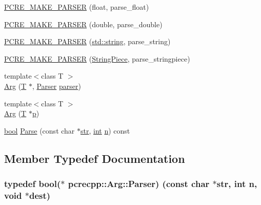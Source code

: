 \begin{DoxyCompactItemize}
\item 
\hyperlink{classpcrecpp_1_1Arg_a0fa5f65840145efa1d6d79f80f412862}{P\+C\+R\+E\+\_\+\+M\+A\+K\+E\+\_\+\+P\+A\+R\+S\+ER} (float, parse\+\_\+float)
\item 
\hyperlink{classpcrecpp_1_1Arg_a58419213aca75ce8526a4eb9ff2c5d2a}{P\+C\+R\+E\+\_\+\+M\+A\+K\+E\+\_\+\+P\+A\+R\+S\+ER} (double, parse\+\_\+double)
\item 
\hyperlink{classpcrecpp_1_1Arg_a7e1441a612c6237314368904bc7d4d1b}{P\+C\+R\+E\+\_\+\+M\+A\+K\+E\+\_\+\+P\+A\+R\+S\+ER} (\hyperlink{pcre_8txt_ad52baeed02a03dda73cbe504945c9c35}{std\+::string}, parse\+\_\+string)
\item 
\hyperlink{classpcrecpp_1_1Arg_a5da3e9c0355d6fbfbe93bd4b0d645443}{P\+C\+R\+E\+\_\+\+M\+A\+K\+E\+\_\+\+P\+A\+R\+S\+ER} (\hyperlink{classpcrecpp_1_1StringPiece}{String\+Piece}, parse\+\_\+stringpiece)
\item 
{\footnotesize template$<$class T $>$ }\\\hyperlink{classpcrecpp_1_1Arg_ab3bf3de8cf5948d738ab5dc9eff53488}{Arg} (\hyperlink{sljitNativeMIPS__common_8c_ae53008cb938e8e14ae47291e41be8bec}{T} $\ast$, \hyperlink{classpcrecpp_1_1Arg_a311bfa3975ffb650e0168fcc3cc47316}{Parser} \hyperlink{group__APR__Util__XML_ga770a26ab91fad38f2253d5450d6e600e}{parser})
\item 
{\footnotesize template$<$class T $>$ }\\\hyperlink{classpcrecpp_1_1Arg_a9fc2f32de83782eb7dfd0010c46b09bc}{Arg} (\hyperlink{sljitNativeMIPS__common_8c_ae53008cb938e8e14ae47291e41be8bec}{T} $\ast$\hyperlink{group__APACHE__CORE__MPM_ga5cd91701e5c167f2b1a38e70ab57817e}{p})
\item 
\hyperlink{aplibtool_8c_ad5c9d4ba3dc37783a528b0925dc981a0}{bool} \hyperlink{classpcrecpp_1_1Arg_ad7a833eab191ad16fd570841957b1f2d}{Parse} (const char $\ast$\hyperlink{group__APR__Util__Bucket__Brigades_ga6a62b60443be1d042194af15ce934193}{str}, \hyperlink{pcre_8txt_a42dfa4ff673c82d8efe7144098fbc198}{int} \hyperlink{pcregrep_8txt_ab232d334efb9173a12ae2940d035f460}{n}) const 
\end{DoxyCompactItemize}


\subsection{Member Typedef Documentation}
\subsubsection[{\texorpdfstring{Parser}{Parser}}]{\setlength{\rightskip}{0pt plus 5cm}typedef {\bf bool}($\ast$ pcrecpp\+::\+Arg\+::\+Parser) (const char $\ast${\bf str}, {\bf int} {\bf n}, {\bf void} $\ast${\bf dest})}\hypertarget{classpcrecpp_1_1Arg_a311bfa3975ffb650e0168fcc3cc47316}{}\label{classpcrecpp_1_1Arg_a311bfa3975ffb650e0168fcc3cc47316}


